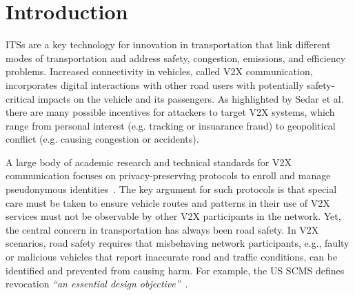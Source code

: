 \section{Introduction}

\acp{ITS} are a key technology for innovation in transportation that link
different modes of transportation and address safety, congestion, emissions,
and efficiency problems. Increased connectivity in vehicles, called \ac{V2X}
communication, incorporates digital interactions with other road users with
potentially safety-critical impacts on the vehicle and its passengers.
As highlighted by Sedar et al.~\cite{sedar2023v2x_survey} there are many
possible incentives for attackers to target \ac{V2X} systems, which range from
personal interest (e.g. tracking or insuarance fraud) to geopolitical
conflict (e.g. causing congestion or accidents).

A large body of academic research and technical standards for \ac{V2X}
communication focuses on privacy-preserving protocols to enroll and manage
pseudonymous
identities~\cite{whitefield2017privacy,desmoulins2019practical,larsen2021daa,etsi2021102940,etsi2022102941,brecht2018scms}.
The key argument for such protocols is that special care must
be taken to ensure vehicle routes and patterns in their use of \ac{V2X}
services must not be observable by other
\ac{V2X} participants in the network.
Yet,
the central concern in transportation has always been road safety.
In \ac{V2X} scenarios, road safety requires that
misbehaving network participants, e.g., faulty or malicious vehicles
that report inaccurate road and traffic conditions, can be identified and
prevented from causing harm. For example, the US \ac{SCMS} defines revocation
\emph{``an essential design objective''}~\cite{brecht2018scms}.

